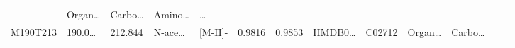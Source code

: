 \documentclass[
]{article}
\begin{document}
\begin{longtable}[]{@{}lllllllllllll@{}}
\begin{minipage}[t]{0.04\columnwidth}
\end{minipage} & \begin{minipage}[t]{0.05\columnwidth}\raggedright
Organ\ldots{}\strut
\end{minipage} & \begin{minipage}[t]{0.05\columnwidth}\raggedright
Carbo\ldots{}\strut
\end{minipage} & \begin{minipage}[t]{0.05\columnwidth}\raggedright
Amino\ldots{}\strut
\end{minipage} & \begin{minipage}[t]{0.02\columnwidth}\raggedright
\ldots{}\strut
\end{minipage}\tabularnewline
\begin{minipage}[t]{0.05\columnwidth}\raggedright
M190T213\strut
\end{minipage} & \begin{minipage}[t]{0.05\columnwidth}\raggedright
190.0\ldots{}\strut
\end{minipage} & \begin{minipage}[t]{0.05\columnwidth}\raggedright
212.844\strut
\end{minipage} & \begin{minipage}[t]{0.05\columnwidth}\raggedright
N-ace\ldots{}\strut
\end{minipage} & \begin{minipage}[t]{0.05\columnwidth}\raggedright
{[}M-H{]}-\strut
\end{minipage} & \begin{minipage}[t]{0.07\columnwidth}\raggedright
0.9816\strut
\end{minipage} & \begin{minipage}[t]{0.07\columnwidth}\raggedright
0.9853\strut
\end{minipage} & \begin{minipage}[t]{0.05\columnwidth}\raggedright
HMDB0\ldots{}\strut
\end{minipage} & \begin{minipage}[t]{0.04\columnwidth}\raggedright
C02712\strut
\end{minipage} & \begin{minipage}[t]{0.05\columnwidth}\raggedright
Organ\ldots{}\strut
\end{minipage} & \begin{minipage}[t]{0.05\columnwidth}\raggedright
Carbo\ldots{}\strut
\end{minipage} & \begin{minipage}[t]{0.05\columnwidth}\raggedright

\end{minipage}
\end{longtable}
\end{document}
